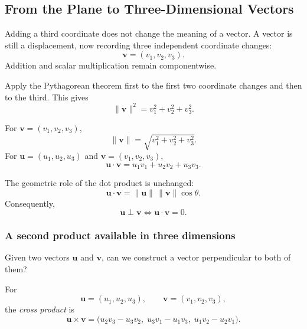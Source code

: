 \subsection{From the Plane to Three-Dimensional Vectors}

\begin{corebox}
Adding a third coordinate does not change the meaning of a vector. A vector is
still a displacement, now recording three independent coordinate changes:
\[
\boxed{\mathbf v=(v_1,v_2,v_3)}.
\]
Addition and scalar multiplication remain componentwise.
\end{corebox}

\begin{derivationbox}
Apply the Pythagorean theorem first to the first two coordinate changes and then
to the third. This gives
\[
\|\mathbf v\|^2=v_1^2+v_2^2+v_3^2.
\]
\end{derivationbox}

\begin{definitionbox}
For $\mathbf v=(v_1,v_2,v_3)$,
\[
\boxed{
\|\mathbf v\|=\sqrt{v_1^2+v_2^2+v_3^2}
}.
\]
For $\mathbf u=(u_1,u_2,u_3)$ and $\mathbf v=(v_1,v_2,v_3)$,
\[
\boxed{
\mathbf u\cdot\mathbf v
=u_1v_1+u_2v_2+u_3v_3
}.
\]
\end{definitionbox}

\begin{theorembox}
The geometric role of the dot product is unchanged:
\[
\mathbf u\cdot\mathbf v
=\|\mathbf u\|\,\|\mathbf v\|\cos\theta.
\]
Consequently,
\[
\boxed{
\mathbf u\perp\mathbf v
\iff
\mathbf u\cdot\mathbf v=0
}.
\]
\end{theorembox}

\subsubsection*{A second product available in three dimensions}

\begin{corebox}
Given two vectors $\mathbf u$ and $\mathbf v$, can we construct a vector
perpendicular to both of them?
\end{corebox}

\begin{definitionbox}
For
\[
\mathbf u=(u_1,u_2,u_3),
\qquad
\mathbf v=(v_1,v_2,v_3),
\]
the \emph{cross product} is
\[
\boxed{
\mathbf u\times\mathbf v
=
\bigl(
 u_2v_3-u_3v_2,
\;u_3v_1-u_1v_3,
\;u_1v_2-u_2v_1
\bigr)
}.
\]
\end{definitionbox}

